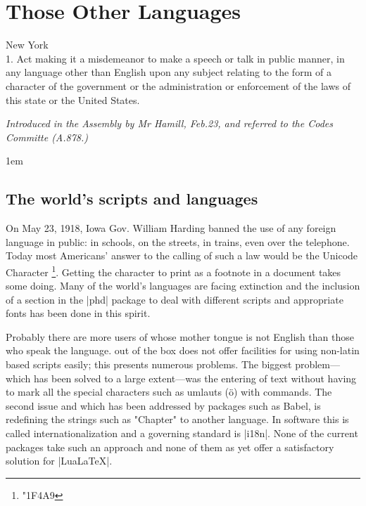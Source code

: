 


\chapter{Those Other Languages}

\epigraph{New York\\
          1. Act making it a misdemeanor to make a speech or talk in public manner, in any language other
than English upon any subject relating to the form of a character of the government or the administration or enforcement of the laws of this state or the United States. }{\itshape Introduced in the Assembly by Mr Hamill, Feb.23, and referred to the Codes Committe (A.878.)}

\parindent1em



\section{The world's scripts and languages}

\newfontfamily{}
On May 23, 1918, Iowa Gov. William Harding banned the use of any foreign language in public: in schools, on the streets, in trains, even over the telephone. Today most Americans' answer to the calling of such a law would be the Unicode Character \footnote{\protect\emoji\protect\char"1F4A9}. Getting the character to print as a footnote in a document takes some doing. Many of the world's languages are facing extinction and the inclusion of a section in the |phd| package to deal with different scripts and appropriate fonts has been done in this spirit.
 
Probably there are more users of \latexe whose mother tongue is not English than those who speak the language. \tex out of the box does not offer facilities for using non-latin based scripts easily; this presents numerous problems. The biggest problem---which has been solved to a large extent---was the entering of text without having to mark all the special
characters such as umlauts (\"o) with commands. The second issue and which has been addressed by packages such as Babel, is redefining the strings such as "Chapter" to another language. In software this is called internationalization and a governing standard is |i18n|. None of the current packages take such an approach and none of them as yet offer a satisfactory solution for |LuaLaTeX|. 

